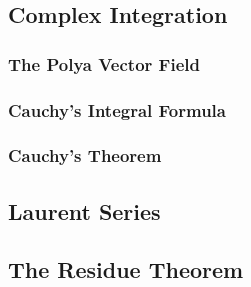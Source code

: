 \subsection{Complex Integration}





\subsubsection{The Polya Vector Field}


\subsubsection{Cauchy's Integral Formula}

\subsubsection{Cauchy's Theorem}


\subsection{Laurent Series}

\subsection{The Residue Theorem}

